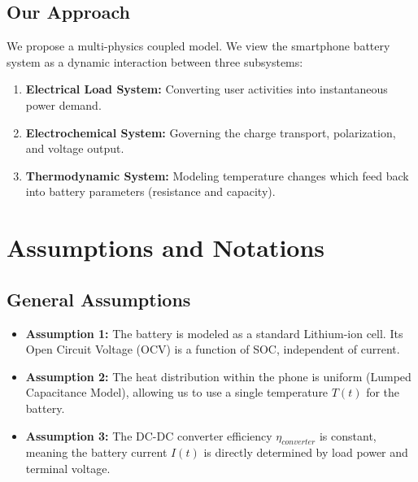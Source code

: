 \documentclass[12pt]{article}
\begin{document}
\subsection{Our Approach}
We propose a multi-physics coupled model. We view the smartphone battery system as a dynamic interaction between three subsystems:
\begin{enumerate}
    \item \textbf{Electrical Load System:} Converting user activities into instantaneous power demand.
    \item \textbf{Electrochemical System:} Governing the charge transport, polarization, and voltage output.
    \item \textbf{Thermodynamic System:} Modeling temperature changes which feed back into battery parameters (resistance and capacity).
\end{enumerate}

\section{Assumptions and Notations}

\subsection{General Assumptions}
\begin{itemize}
    \item \textbf{Assumption 1:} The battery is modeled as a standard Lithium-ion cell. Its Open Circuit Voltage (OCV) is a function of SOC, independent of current.
    \item \textbf{Assumption 2:} The heat distribution within the phone is uniform (Lumped Capacitance Model), allowing us to use a single temperature $T(t)$ for the battery.
    \item \textbf{Assumption 3:} The DC-DC converter efficiency $\eta_{converter}$ is constant, meaning the battery current $I(t)$ is directly determined by load power and terminal voltage.
\end{itemize}
\end{document}
